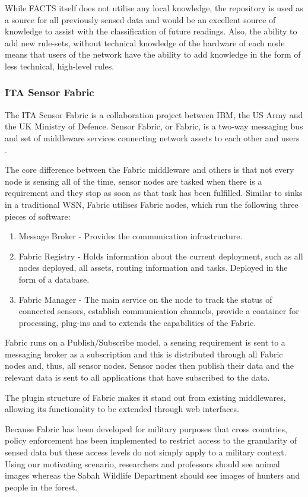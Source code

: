 		While FACTS itself does not utilise any local knowledge, the repository is used as a source for all previously sensed data and would be an excellent source of knowledge to assist with the classification of future readings. Also, the ability to add new rule-sets, without technical knowledge of the hardware of each node means that users of the network have the ability to add knowledge in the form of less technical, high-level rules.

	\subsubsection{ITA Sensor Fabric}
	The ITA Sensor Fabric is a collaboration project between IBM, the US Army and the UK Ministry of Defence. Sensor Fabric, or Fabric, is a two-way messaging bus and set of middleware services connecting network assets to each other and users \cite{Wright2009b}.

The core difference between the Fabric middleware and others is that not every node is sensing all of the time, sensor nodes are tasked when there is a requirement and they stop as soon as that task has been fulfilled. Similar to sinks in a traditional WSN, Fabric utilises Fabric nodes, which run the following three pieces of software:
\begin{enumerate}
	\item Message Broker - Provides the communication infrastructure.
	\item Fabric Registry - Holds information about the current deployment, such as all nodes deployed, all assets, routing information and tasks. Deployed in the form of a database.
	\item Fabric Manager - The main service on the node to track the status of connected sensors, establish communication channels, provide a container for processing, plug-ins and to extends the capabilities of the Fabric.
\end{enumerate}

Fabric runs on a Publish/Subscribe model, a sensing requirement is sent to a messaging broker as a subscription and this is distributed through all Fabric nodes and, thus, all sensor nodes. Sensor nodes then publish their data and the relevant data is sent to all applications that have subscribed to the data. 

The plugin structure of Fabric makes it stand out from existing middlewares, allowing its functionality to be extended through web interfaces.

Because Fabric has been developed for military purposes that cross countries, policy enforcement has been implemented to restrict access to the granularity of sensed data but these access levels do not simply apply to a military context. Using our motivating scenario, researchers and professors should see animal images whereas the Sabah Wildlife Department should see images of hunters and people in the forest.

